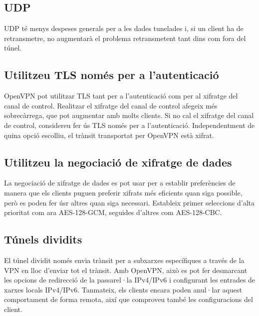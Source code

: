 \documentclass[
  10pt,
]{krantz}
\begin{document}
\hypertarget{udp}{%
\subsection{UDP}\label{udp}}

UDP té menys despeses generals per a les dades tunelades i, si un client ha de retransmetre, no augmentarà el problema retransmetent tant dins com fora del túnel.

\hypertarget{utilitzeu-tls-nomuxe9s-per-a-lautenticaciuxf3}{%
\subsection{Utilitzeu TLS només per a l'autenticació}\label{utilitzeu-tls-nomuxe9s-per-a-lautenticaciuxf3}}

OpenVPN pot utilitzar TLS tant per a l'autenticació com per al xifratge del canal de control. Realitzar el xifratge del canal de control afegeix més sobrecàrrega, que pot augmentar amb molts clients. Si no cal el xifratge del canal de control, considereu fer ús TLS només per a l'autenticació. Independentment de quina opció escolliu, el trànsit transportat per OpenVPN està xifrat.

\hypertarget{utilitzeu-la-negociaciuxf3-de-xifratge-de-dades}{%
\subsection{Utilitzeu la negociació de xifratge de dades}\label{utilitzeu-la-negociaciuxf3-de-xifratge-de-dades}}

La negociació de xifratge de dades es pot usar per a establir preferències de manera que els clients puguen preferir xifrats més eficients quan siga possible, però es poden fer úsr altres quan siga necessari. Estableix primer seleccions d'alta prioritat com ara AES-128-GCM, seguides d'altres com AES-128-CBC.

\hypertarget{tuxfanels-dividits}{%
\subsection{Túnels dividits}\label{tuxfanels-dividits}}

El túnel dividit només envia trànsit per a subxarxes específiques a través de la VPN en lloc d'enviar tot el trànsit. Amb OpenVPN, això es pot fer desmarcant les opcions de redirecció de la passarel·la IPv4/IPv6 i configurant les entrades de xarxes locals IPv4/IPv6. Tanmateix, els clients encara poden anul·lar aquest comportament de forma remota, així que comproveu també les configuracions del client.
\end{document}
